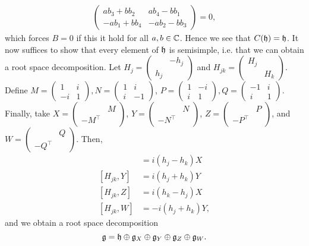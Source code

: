 \documentclass{../../mathnotes}
\begin{document}
\begin{align*}
    \begin{pmatrix}
        ab_3+bb_2&ab_4-bb_1\\
        -ab_1+bb_4&-ab_2-bb_3
    \end{pmatrix}
    =0,
\end{align*}
which forces $B=0$ if this it hold for all $a,b\in\mathbb{C}$. Hence we see that $C(\mathfrak h)=\mathfrak h$. It now suffices
to show that every element of $\mathfrak h$ is semisimple, i.e. that we can obtain a root space decomposition.
Let $H_j=\begin{pmatrix}&-h_j\\h_j&\end{pmatrix}$ and $H_{jk}=\begin{pmatrix}H_j&\\&H_k\end{pmatrix}$.
Define $M=\begin{pmatrix}1&i\\-i&1\end{pmatrix},N=\begin{pmatrix}1&i\\i&-1\end{pmatrix}$,
$P=\begin{pmatrix}1&-i\\i&1\end{pmatrix}, Q=\begin{pmatrix}-1&i\\i&1\end{pmatrix}$.
Finally, take $X=\begin{pmatrix}&M\\-M^\intercal&\end{pmatrix}$, $Y=\begin{pmatrix}&N\\-N^\intercal&\end{pmatrix}$,
$Z=\begin{pmatrix}&P\\-P^\intercal&\end{pmatrix}$, and $W=\begin{pmatrix}&Q\\-Q^\intercal&\end{pmatrix}$. Then,
\begin{align*}
    [H_{jk},X]&=i(h_j-h_k)X\\
    [H_{jk},Y]&=i(h_j+h_k)Y\\
    [H_{jk},Z]&=i(h_k-h_j)X\\
    [H_{jk},W]&=-i(h_j+h_k)Y,
\end{align*}
and we obtain a root space decomposition
\[\mathfrak g=\mathfrak h \oplus \mathfrak g_X\oplus\mathfrak g_Y\oplus\mathfrak g_Z\oplus\mathfrak g_W.\]
\end{document}
